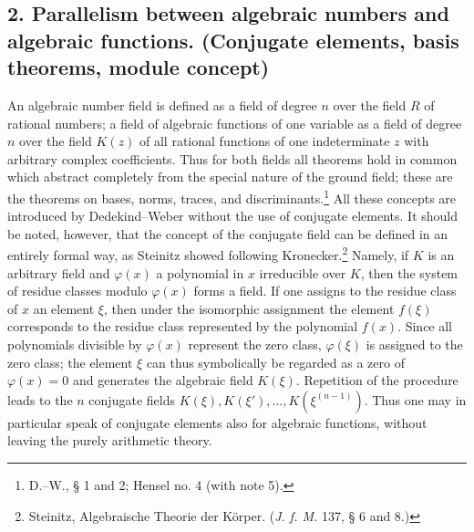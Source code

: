 \documentclass[11pt]{article}
\begin{document}
\subsection*{2. Parallelism between algebraic numbers and algebraic functions. (Conjugate elements, basis theorems, module concept)}
An algebraic number field is defined as a field of degree \(n\) over the field \(R\) of rational numbers; a field of algebraic functions of one variable as a field of degree \(n\) over the field \(K(z)\) of all rational functions of one indeterminate \(z\) with arbitrary complex coefficients. Thus for both fields all theorems hold in common which abstract completely from the special nature of the ground field; these are the theorems on bases, norms, traces, and discriminants.\footnote{D.--W., § 1 and 2; Hensel no. 4 (with note 5).} All these concepts are introduced by Dedekind--Weber without the use of conjugate elements. It should be noted, however, that the concept of the conjugate field can be defined in an entirely formal way, as Steinitz showed following Kronecker.\footnote{Steinitz, Algebraische Theorie der Körper. (\emph{J. f. M.} 137, § 6 and 8.)} Namely, if \(K\) is an arbitrary field and \(\varphi(x)\) a polynomial in \(x\) irreducible over \(K\), then the system of residue classes modulo \(\varphi(x)\) forms a field. If one assigns to the residue class of \(x\) an element \(\xi\), then under the isomorphic assignment the element \(f(\xi)\) corresponds to the residue class represented by the polynomial \(f(x)\). Since all polynomials divisible by \(\varphi(x)\) represent the zero class, \(\varphi(\xi)\) is assigned to the zero class; the element \(\xi\) can thus symbolically be regarded as a zero of \(\varphi(x)=0\) and generates the algebraic field \(K(\xi)\). Repetition of the procedure leads to the \(n\) conjugate fields \(K(\xi),K(\xi'),\ldots,K(\xi^{(n-1)})\). Thus one may in particular speak of conjugate elements also for algebraic functions, without leaving the purely arithmetic theory.
\end{document}
